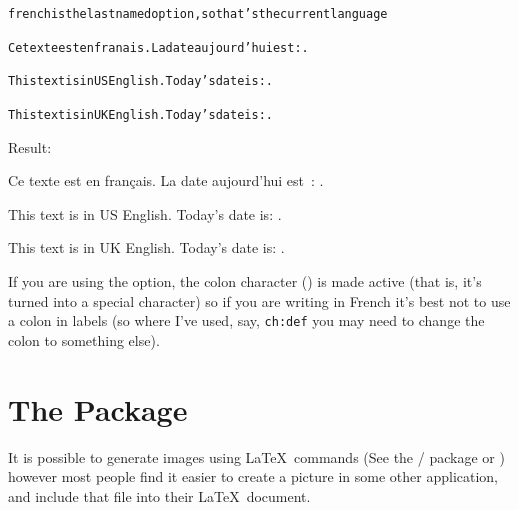 \begin{code}
\begin{alltt}
 french is the last named option, so that's the current language


Ce texte est en franais. La date aujourd'hui est: .

This text is in US English. Today's date is: .

This text is in UK English. Today's date is: .
\end{alltt}
\end{code}
Result:
\begin{result}
Ce texte est en fran\c{c}ais. La date aujourd'hui est~: 
{\datefrench\docdate}.

This text is in US English. Today's date is: {\usdate\docdate}.

This text is in UK English. Today's date is: {\ukenglishdate\docdate}.
\end{result}

\warning If you are using the  option, the
colon character (\Indextt{:}) is made active (that is, it's turned
into a special character) so if you are writing in French it's best
not to use a colon in labels (so where I've used, say,
\texttt{ch:def} you may need to change the colon to something else).


\chapter{The \texorpdfstring{}{graphicx} Package}
\label{ch:graphicx}

It is possible to generate images using \LaTeX\ commands (See the \slash{} package or
\latexgraphic) however most people find it easier to create a
picture in some other application, and include that file into their
\LaTeX\ document.

